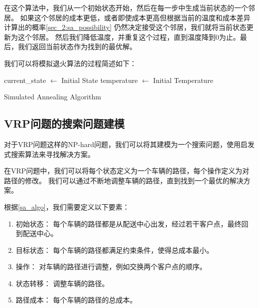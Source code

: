 在这个算法中，我们从一个初始状态开始，然后在每一步中生成当前状态的一个邻居。
如果这个邻居的成本更低，或者即使成本更高但根据当前的温度和成本差异计算出的概率\ref{sec_2:sa_possibility}
仍然决定接受这个邻居，我们就将当前状态更新为这个邻居。
然后我们降低温度，并重复这个过程，直到温度降到0为止。最后，我们返回当前状态作为找到的最优解。

我们可以将模拟退火算法的过程简述如下：

\begin{algorithm}[H]
    
    
    current\_state $\leftarrow$ Initial State\;
    temperature $\leftarrow$ Initial Temperature\;


    \caption{Simulated Annealing Algorithm}
    \label{sa_algo}
\end{algorithm}

\subsection{VRP问题的搜索问题建模}

对于VRP问题这样的NP-hard问题，我们可以将其建模为一个搜索问题，使用启发式搜索算法来寻找解决方案。

在VRP问题中，我们可以将每个状态定义为一个车辆的路径，每个操作定义为对路径的修改。
我们可以通过不断地调整车辆的路径，直到找到一个最优的解决方案。

根据\ref{sa_algo}，我们需要定义以下要素：

\begin{enumerate}
    \item 初始状态： 每个车辆的路径都是从配送中心出发，经过若干客户点，最终回到配送中心。
    \item 目标状态： 每个车辆的路径都满足约束条件，使得总成本最小。
    \item 操作： 对车辆的路径进行调整，例如交换两个客户点的顺序。
    \item 状态转移： 调整车辆的路径。
    \item 路径成本： 每个车辆的路径的总成本。
\end{enumerate}

